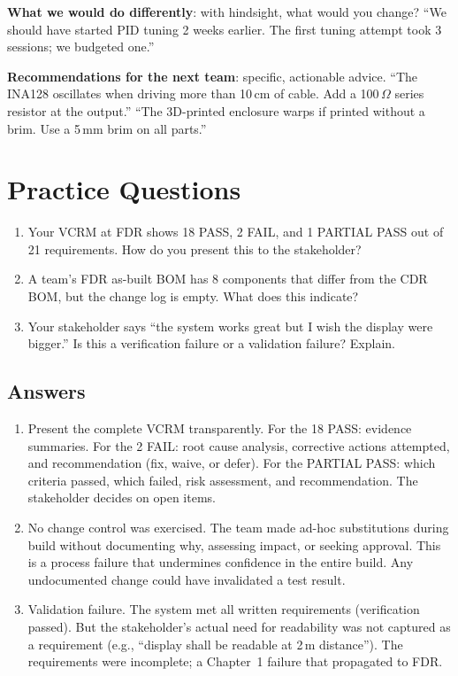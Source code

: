 \textbf{What we would do differently}: with hindsight, what would you change? ``We should have started PID tuning 2 weeks earlier. The first tuning attempt took 3 sessions; we budgeted one.''

\textbf{Recommendations for the next team}: specific, actionable advice. ``The INA128 oscillates when driving more than 10\,cm of cable. Add a 100\,$\Omega$ series resistor at the output.'' ``The 3D-printed enclosure warps if printed without a brim. Use a 5\,mm brim on all parts.''
\section{Practice Questions}
\begin{enumerate}[leftmargin=1.5em]
\item Your VCRM at FDR shows 18 PASS, 2 FAIL, and 1 PARTIAL PASS out of 21 requirements. How do you present this to the stakeholder?
\item A team's FDR as-built BOM has 8 components that differ from the CDR BOM, but the change log is empty. What does this indicate?
\item Your stakeholder says ``the system works great but I wish the display were bigger.'' Is this a verification failure or a validation failure? Explain.
\end{enumerate}

\subsection{Answers}
\begin{enumerate}[leftmargin=1.5em]
\item Present the complete VCRM transparently. For the 18 PASS: evidence summaries. For the 2 FAIL: root cause analysis, corrective actions attempted, and recommendation (fix, waive, or defer). For the PARTIAL PASS: which criteria passed, which failed, risk assessment, and recommendation. The stakeholder decides on open items.
\item No change control was exercised. The team made ad-hoc substitutions during build without documenting why, assessing impact, or seeking approval. This is a process failure that undermines confidence in the entire build. Any undocumented change could have invalidated a test result.
\item Validation failure. The system met all written requirements (verification passed). But the stakeholder's actual need for readability was not captured as a requirement (e.g., ``display shall be readable at 2\,m distance''). The requirements were incomplete; a Chapter~1 failure that propagated to FDR.
\end{enumerate}


